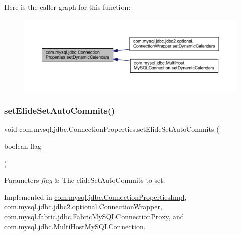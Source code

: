 Here is the caller graph for this function\+:\nopagebreak
\begin{figure}[H]
\begin{center}
\leavevmode
\includegraphics[width=350pt]{interfacecom_1_1mysql_1_1jdbc_1_1_connection_properties_a01fd5822e9a8d49fb51172c50e3d0d31_icgraph}
\end{center}
\end{figure}
\mbox{\label{interfacecom_1_1mysql_1_1jdbc_1_1_connection_properties_ae95924c9d1da3b93b44b58b33089d251}} 
\subsubsection{\texorpdfstring{set\+Elide\+Set\+Auto\+Commits()}{setElideSetAutoCommits()}}
{\footnotesize\ttfamily void com.\+mysql.\+jdbc.\+Connection\+Properties.\+set\+Elide\+Set\+Auto\+Commits (\begin{DoxyParamCaption}\item[{boolean}]{flag }\end{DoxyParamCaption})}


\begin{DoxyParams}{Parameters}
{\em flag} & The elide\+Set\+Auto\+Commits to set. \\
\hline
\end{DoxyParams}


Implemented in \mbox{\hyperlink{classcom_1_1mysql_1_1jdbc_1_1_connection_properties_impl_acb5e889f55e3a05564dab69fcf819b86}{com.\+mysql.\+jdbc.\+Connection\+Properties\+Impl}}, \mbox{\hyperlink{classcom_1_1mysql_1_1jdbc_1_1jdbc2_1_1optional_1_1_connection_wrapper_ae265f34efd113d6df170b5354eb960f0}{com.\+mysql.\+jdbc.\+jdbc2.\+optional.\+Connection\+Wrapper}}, \mbox{\hyperlink{classcom_1_1mysql_1_1fabric_1_1jdbc_1_1_fabric_my_s_q_l_connection_proxy_a5ed535340c2bf69d0e025ea81fdf2fb9}{com.\+mysql.\+fabric.\+jdbc.\+Fabric\+My\+S\+Q\+L\+Connection\+Proxy}}, and \mbox{\hyperlink{classcom_1_1mysql_1_1jdbc_1_1_multi_host_my_s_q_l_connection_a35d47c30cf0ef068eea0302f63e99226}{com.\+mysql.\+jdbc.\+Multi\+Host\+My\+S\+Q\+L\+Connection}}.

